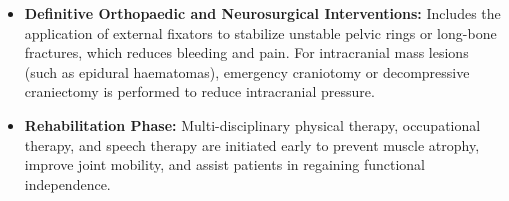 \begin{itemize}
    \begin{itemize}
        \item \textit{Stage 1 (Abbreviated Operation):} Immediate surgery to stop active bleeding (using ligatures, vascular shunts, or packing) and control gastrointestinal contamination. The surgical wound is left open with a temporary abdominal closure.
        \textit{Stage 2 (ICU Resuscitation):} The patient is transferred to the ICU to correct hypothermia, acidosis, and coagulopathy, and to optimize oxygen delivery.
        \item \textit{Stage 3 (Definitive Repair):} The patient returns to the operating theatre 24--48 hours later, once physiological parameters have normalized, for definitive anatomical repair and abdominal closure.
    \end{itemize}
    \item \textbf{Definitive Orthopaedic and Neurosurgical Interventions:} Includes the application of external fixators to stabilize unstable pelvic rings or long-bone fractures, which reduces bleeding and pain. For intracranial mass lesions (such as epidural haematomas), emergency craniotomy or decompressive craniectomy is performed to reduce intracranial pressure.
    \item \textbf{Rehabilitation Phase:} Multi-disciplinary physical therapy, occupational therapy, and speech therapy are initiated early to prevent muscle atrophy, improve joint mobility, and assist patients in regaining functional independence.
\end{itemize}

